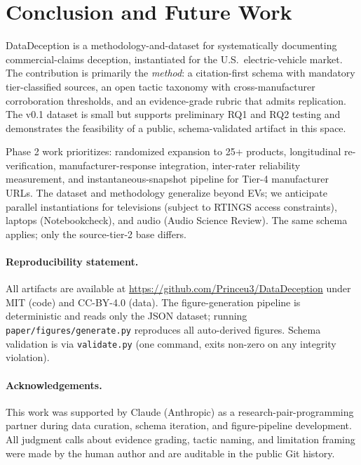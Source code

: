 \documentclass{article}
\begin{document}
\section{Conclusion and Future Work}\label{sec:conclusion}

DataDeception is a methodology-and-dataset for systematically documenting commercial-claims deception, instantiated for the U.S.\ electric-vehicle market. The contribution is primarily the \emph{method}: a citation-first schema with mandatory tier-classified sources, an open tactic taxonomy with cross-manufacturer corroboration thresholds, and an evidence-grade rubric that admits replication. The v0.1 dataset is small but supports preliminary RQ1 and RQ2 testing and demonstrates the feasibility of a public, schema-validated artifact in this space.

Phase 2 work prioritizes: randomized expansion to 25+ products, longitudinal re-verification, manufacturer-response integration, inter-rater reliability measurement, and instantaneous-snapshot pipeline for Tier-4 manufacturer URLs. The dataset and methodology generalize beyond EVs; we anticipate parallel instantiations for televisions (subject to RTINGS access constraints), laptops (Notebookcheck), and audio (Audio Science Review). The same schema applies; only the source-tier-2 base differs.

\paragraph{Reproducibility statement.} All artifacts are available at \url{https://github.com/Princeu3/DataDeception} under MIT (code) and CC-BY-4.0 (data). The figure-generation pipeline is deterministic and reads only the JSON dataset; running \texttt{paper/figures/generate.py} reproduces all auto-derived figures. Schema validation is via \texttt{validate.py} (one command, exits non-zero on any integrity violation).

\paragraph{Acknowledgements.} This work was supported by Claude (Anthropic) as a research-pair-programming partner during data curation, schema iteration, and figure-pipeline development. All judgment calls about evidence grading, tactic naming, and limitation framing were made by the human author and are auditable in the public Git history.



\end{document}
